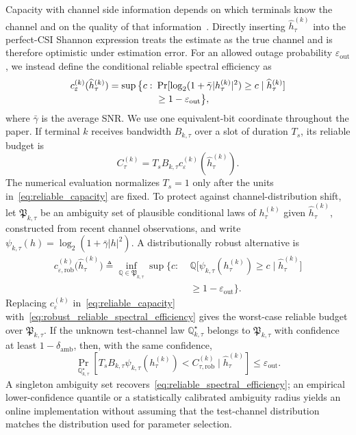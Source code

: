 \documentclass[journal]{IEEEtran}
\begin{document}
Capacity with channel side information depends on which terminals know the channel and on the quality of that information~\cite{goldsmith1997capacity,medard2000imperfect}. Directly inserting $\widehat h_{\tau}^{(k)}$ into the perfect-CSI Shannon expression treats the estimate as the true channel and is therefore optimistic under estimation error. For an allowed outage probability $\varepsilon_{\mathrm{out}}$, we instead define the conditional reliable spectral efficiency as
\begin{align}
c_{\varepsilon}^{(k)}(\widehat h_{\tau}^{(k)})
=\sup\big\{c:~&\Pr[\log_2(1+\bar\gamma|h_{\tau}^{(k)}|^2)\geq c
\mid \widehat h_{\tau}^{(k)}]
\notag\\[-0.2em]
&\geq 1-\varepsilon_{\mathrm{out}}\big\},
\label{eq:reliable_spectral_efficiency}
\end{align}
where $\bar\gamma$ is the average SNR. We use one equivalent-bit coordinate throughout the paper. If terminal $k$ receives bandwidth $B_{k,\tau}$ over a slot of duration $T_s$, its reliable budget is
\begin{equation}
C_{\tau}^{(k)}
=T_sB_{k,\tau}c_{\varepsilon}^{(k)}(\widehat h_{\tau}^{(k)}).
\label{eq:reliable_capacity}
\end{equation}
The numerical evaluation normalizes $T_s=1$ only after the units in~\eqref{eq:reliable_capacity} are fixed. To protect against channel-distribution shift, let $\mathfrak P_{k,\tau}$ be an ambiguity set of plausible conditional laws of $h_{\tau}^{(k)}$ given $\widehat h_{\tau}^{(k)}$, constructed from recent channel observations, and write $\psi_{k,\tau}(h)=\log_2(1+\bar\gamma|h|^2)$. A distributionally robust alternative is
\begin{equation}
\begin{split}
c_{\varepsilon,\mathrm{rob}}^{(k)}
\big(\widehat h_{\tau}^{(k)}\big)
\triangleq
\inf_{\mathbb Q\in\mathfrak P_{k,\tau}}
\sup\big\{c:\;&
\mathbb Q\big[
\psi_{k,\tau}(h_{\tau}^{(k)})\geq c
\mid\widehat h_{\tau}^{(k)}
\big]
\\[-0.2em]
&\geq1-\varepsilon_{\mathrm{out}}\big\}.
\end{split}
\label{eq:robust_reliable_spectral_efficiency}
\end{equation}
Replacing $c_{\varepsilon}^{(k)}$ in~\eqref{eq:reliable_capacity} with~\eqref{eq:robust_reliable_spectral_efficiency} gives the worst-case reliable budget over $\mathfrak P_{k,\tau}$. If the unknown test-channel law $\mathbb Q_{k,\tau}^{\star}$ belongs to $\mathfrak P_{k,\tau}$ with confidence at least $1-\delta_{\mathrm{amb}}$, then, with the same confidence,
\begin{equation}
\Pr_{\mathbb Q_{k,\tau}^{\star}}
\!\left[
T_sB_{k,\tau}\psi_{k,\tau}(h_{\tau}^{(k)})
<C_{\tau,\mathrm{rob}}^{(k)}
\mid\widehat h_{\tau}^{(k)}
\right]
\leq\varepsilon_{\mathrm{out}}.
\label{eq:distribution_shift_outage}
\end{equation}
A singleton ambiguity set recovers~\eqref{eq:reliable_spectral_efficiency}; an empirical lower-confidence quantile or a statistically calibrated ambiguity radius yields an online implementation without assuming that the test-channel distribution matches the distribution used for parameter selection.
\end{document}
